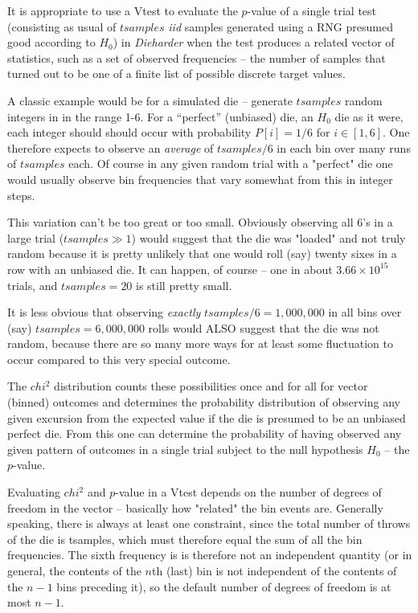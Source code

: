 \documentclass[12pt]{article}
\begin{document}
It is appropriate to use a Vtest to evaluate the $p$-value of a single
trial test (consisting as usual of $tsamples$ {\em iid} samples
generated using a RNG presumed good according to $H_0$) in {\em
Dieharder} when the test produces a related vector of statistics, such
as a set of observed frequencies -- the number of samples that turned
out to be one of a finite list of possible discrete target values.

A classic example would be for a simulated die -- generate $tsamples$
random integers in in the range 1-6.  For a ``perfect'' (unbiased) die,
an $H_0$ die as it were, each integer should should occur with
probability $P[i] = 1/6$ for $i\in [1,6]$.  One therefore expects to
observe an {\em average} of $tsamples/6$ in each bin over many runs of
$tsamples$ each.  Of course in any given random trial with a "perfect"
die one would usually observe bin frequencies that vary somewhat from
this in integer steps.

This variation can't be too great or too small.  Obviously observing all
6's in a large trial ($tsamples \gg 1$) would suggest that the die was
"loaded" and not truly random because it is pretty unlikely that one
would roll (say) twenty sixes in a row with an unbiased die.  It can
happen, of course -- one in about $3.66\times10^{15}$ trials, and
$tsamples = 20$ is still pretty small.

It is less obvious that observing {\em exactly} $tsamples/6 = 1,000,000$
in all bins over (say) $tsamples = 6,000,000$ rolls would ALSO suggest
that the die was not random, because there are so many more ways for at
least some fluctuation to occur compared to this very special outcome.

The $chi^2$ distribution counts these possibilities once and for all for
vector (binned) outcomes and determines the probability distribution of
observing any given excursion from the expected value if the die is
presumed to be an unbiased perfect die.  From this one can determine the
probability of having observed any given pattern of outcomes in a single
trial subject to the null hypothesis $H_0$ -- the $p$-value.

Evaluating $chi^2$ and $p$-value in a Vtest depends on the number of
degrees of freedom in the vector -- basically how "related" the bin
events are.  Generally speaking, there is always at least one
constraint, since the total number of throws of the die is tsamples,
which must therefore equal the sum of all the bin frequencies.  The
sixth frequency is is therefore not an independent quantity (or in
general, the contents of the $n$th (last) bin is not independent of the
contents of the $n-1$ bins preceding it), so the default number of
degrees of freedom is at most $n-1$.
\end{document}
